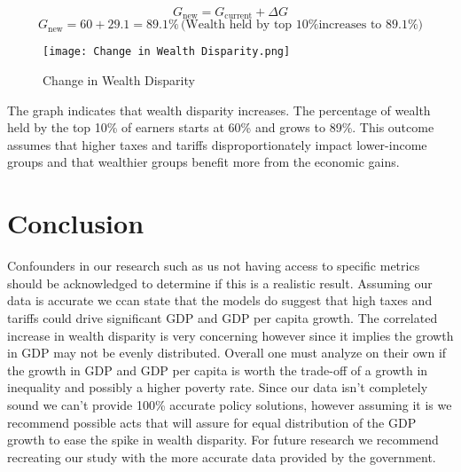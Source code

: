 \documentclass[12pt,letterpaper]{article}
\begin{document}
\[
G_{\text{new}} = G_{\text{current}} + \Delta G
\]
\[
G_{\text{new}} = 60 + 29.1 = 89.1\% \, \text{(Wealth held by top 10\% increases to 89.1\%)}
\]
\begin{figure}[ht]
    \centering
    \texttt{[image: Change in Wealth Disparity.png]}
    \caption{Change in Wealth Disparity}
    \label{fig:3}
\end{figure}

\indent The graph indicates that wealth disparity increases. The percentage of wealth held by the top 10\% of earners starts at 60\% and grows to 89\%. This outcome assumes that higher taxes and tariffs disproportionately impact lower-income groups and that wealthier groups benefit more from the economic gains.

\section{Conclusion}

\indent Confounders in our research such as us not having access to specific metrics should be acknowledged to determine if this is a realistic result. Assuming our data is accurate we ccan state that the models do suggest that high taxes and tariffs could drive significant GDP and GDP per capita growth. The correlated increase in wealth disparity is very concerning however since it implies the growth in GDP may not be evenly distributed. Overall one must analyze on their own if the growth in GDP and GDP per capita is worth the trade-off of a growth in inequality and possibly a higher poverty rate. Since our data isn't completely sound we can't provide 100\% accurate policy solutions, however assuming it is we recommend possible acts that will assure for equal distribution of the GDP growth to ease the spike in wealth disparity. For future research we recommend recreating our study with the more accurate data provided by the government.


\newpage


\citep{Max_Zahn}
\citep{Fiscal}
\citep{BEA}
\citep{CEIC}
\citep{IRS}
\citep{TaxFound}
\citep{Macro}
\citep{WorldM}
\end{document}
